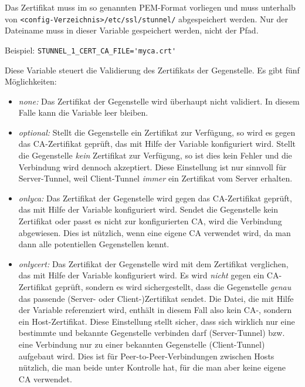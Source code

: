 \begin{description}
Das Zertifikat muss im so genannten PEM-Format vorliegen und muss unterhalb von
\texttt{<config-Verzeichnis>/etc/ssl/stunnel/} abgespeichert werden. Nur
der Dateiname muss in dieser Variable gespeichert werden, nicht der Pfad.

Beispiel: \verb+STUNNEL_1_CERT_CA_FILE='myca.crt'+


Diese Variable steuert die Validierung des Zertifikats der Gegenstelle. Es gibt
fünf Möglichkeiten:

\begin{itemize}
\item \emph{none:} Das Zertifikat der Gegenstelle wird überhaupt nicht
validiert. In diesem Falle kann die Variable 
leer bleiben.

\item \emph{optional:} Stellt die Gegenstelle ein Zertifikat zur Verfügung, so
wird es gegen das CA-Zertifikat geprüft, das mit Hilfe der Variable
 konfiguriert wird. Stellt die Gegenstelle
\emph{kein} Zertifikat zur Verfügung, so ist dies kein Fehler und die
Verbindung wird dennoch akzeptiert. Diese Einstellung ist nur sinnvoll für
Server-Tunnel, weil Client-Tunnel \emph{immer} ein Zertifikat vom Server
erhalten.

\item \emph{onlyca:} Das Zertifikat der Gegenstelle wird gegen das
CA-Zertifikat geprüft, das mit Hilfe der Variable
 konfiguriert wird. Sendet die Gegenstelle kein
Zertifikat oder passt es nicht zur konfigurierten CA, wird die Verbindung
abgewiesen. Dies ist nützlich, wenn eine eigene CA verwendet wird, da man dann
alle potentiellen Gegenstellen kennt.

\item \emph{onlycert:} Das Zertifikat der Gegenstelle wird mit dem Zertifikat
verglichen, das mit Hilfe der Variable 
konfiguriert wird. Es wird \emph{nicht} gegen ein CA-Zertifikat geprüft,
sondern es wird sichergestellt, dass die Gegenstelle \emph{genau} das passende
(Server- oder Client-)Zertifikat sendet. Die Datei, die mit Hilfe der Variable
 referenziert wird, enthält in diesem Fall also
kein CA-, sondern ein Host-Zertifikat. Diese Einstellung stellt sicher, dass
sich wirklich nur eine bestimmte und bekannte Gegenstelle verbinden darf
(Server-Tunnel) bzw. eine Verbindung nur zu einer bekannten Gegenstelle
(Client-Tunnel) aufgebaut wird. Dies ist für Peer-to-Peer-Verbindungen zwischen
Hosts nützlich, die man beide unter Kontrolle hat, für die man aber keine
eigene CA verwendet.


\end{itemize}
\end{description}
